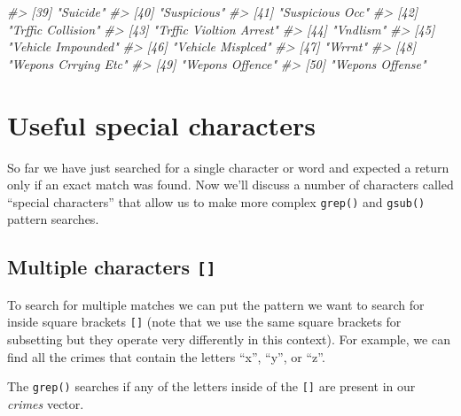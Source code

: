 \documentclass[
  12pt,
]{book}
\newenvironment{Shaded}{\begin{snugshade}}{\end{snugshade}}
\newcommand{\CommentTok}[1]{\textcolor[rgb]{0.56,0.35,0.01}{\textit{#1}}}
\begin{document}
\begin{Shaded}
\begin{Highlighting}[]
\CommentTok{\#> [39] "Suicide"                                }
\CommentTok{\#> [40] "Suspicious"                             }
\CommentTok{\#> [41] "Suspicious Occ"                         }
\CommentTok{\#> [42] "Trffic Collision"                       }
\CommentTok{\#> [43] "Trffic Violtion Arrest"                 }
\CommentTok{\#> [44] "Vndlism"                                }
\CommentTok{\#> [45] "Vehicle Impounded"                      }
\CommentTok{\#> [46] "Vehicle Misplced"                       }
\CommentTok{\#> [47] "Wrrnt"                                  }
\CommentTok{\#> [48] "Wepons Crrying Etc"                     }
\CommentTok{\#> [49] "Wepons Offence"                         }
\CommentTok{\#> [50] "Wepons Offense"}
\end{Highlighting}
\end{Shaded}

\hypertarget{useful-special-characters}{%
\section{Useful special characters}\label{useful-special-characters}}

So far we have just searched for a single character or word and expected a return only if an exact match was found. Now we'll discuss a number of characters called ``special characters'' that allow us to make more complex \texttt{grep()} and \texttt{gsub()} pattern searches.

\hypertarget{multiple-characters}{%
\subsection{\texorpdfstring{Multiple characters \texttt{{[}{]}}}{Multiple characters {[}{]}}}\label{multiple-characters}}

To search for multiple matches we can put the pattern we want to search for inside square brackets \texttt{{[}{]}} (note that we use the same square brackets for subsetting but they operate very differently in this context). For example, we can find all the crimes that contain the letters ``x'', ``y'', or ``z''.

The \texttt{grep()} searches if any of the letters inside of the \texttt{{[}{]}} are present in our \emph{crimes} vector.
\end{document}
